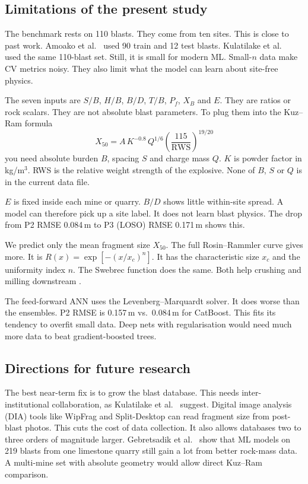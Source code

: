 \documentclass[conference]{IEEEtran}
\begin{document}
\subsection{Limitations of the present study}
The benchmark rests on 110 blasts. They come from ten sites. This is close to past work. Amoako et al.\ \cite{amoako2022} used 90 train and 12 test blasts. Kulatilake et al.\ \cite{kulatilake2010} used the same 110-blast set. Still, it is small for modern ML. Small-$n$ data make CV metrics noisy. They also limit what the model can learn about site-free physics.

The seven inputs are $S/B$, $H/B$, $B/D$, $T/B$, $P_f$, $X_B$ and $E$. They are ratios or rock scalars. They are not absolute blast parameters. To plug them into the Kuz--Ram formula
\begin{equation}
  X_{50} = A\,K^{-0.8}\,Q^{1/6}\!\left(\frac{115}{\mathrm{RWS}}\right)^{19/20}
\end{equation}
you need absolute burden $B$, spacing $S$ and charge mass $Q$. $K$ is powder factor in kg/m$^3$. RWS is the relative weight strength of the explosive. None of $B$, $S$ or $Q$ is in the current data file.

$E$ is fixed inside each mine or quarry. $B/D$ shows little within-site spread. A model can therefore pick up a site label. It does not learn blast physics. The drop from P2 RMSE 0.084\,m to P3 (LOSO) RMSE 0.171\,m shows this.

We predict only the mean fragment size $X_{50}$. The full Rosin--Rammler curve gives more. It is $R(x)=\exp[-(x/x_c)^n]$. It has the characteristic size $x_c$ and the uniformity index $n$. The Swebrec function does the same. Both help crushing and milling downstream \cite{cunningham2005,amoako2022}.

The feed-forward ANN uses the Levenberg--Marquardt solver. It does worse than the ensembles. P2 RMSE is 0.157\,m vs.\ 0.084\,m for CatBoost. This fits its tendency to overfit small data. Deep nets with regularisation would need much more data to beat gradient-boosted trees.

\subsection{Directions for future research}
The best near-term fix is to grow the blast database. This needs inter-institutional collaboration, as Kulatilake et al.\ \cite{kulatilake2010} suggest. Digital image analysis (DIA) tools like WipFrag and Split-Desktop can read fragment size from post-blast photos. This cuts the cost of data collection. It also allows databases two to three orders of magnitude larger. Gebretsadik et al.\ \cite{gebretsadik2024} show that ML models on 219 blasts from one limestone quarry still gain a lot from better rock-mass data. A multi-mine set with absolute geometry would allow direct Kuz--Ram comparison.
\end{document}
